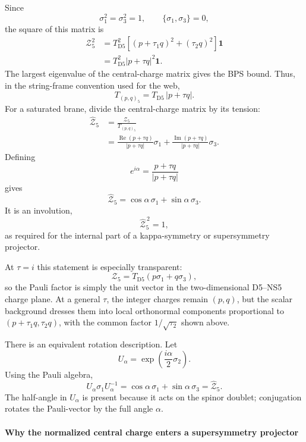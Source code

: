 \documentclass[
  10pt,
  a4paper,
  openany]{book}
\begin{document}
Since \[
\sigma_1^2=\sigma_3^2=1,
\qquad
\{\sigma_1,\sigma_3\}=0,
\] the square of this matrix is \[
\begin{aligned}
\mathcal Z_5^2
&=T_{\mathrm{D5}}^2
\left[
(p+\tau_1q)^2+(\tau_2q)^2
\right]\mathbf1\\
&=T_{\mathrm{D5}}^2|p+\tau q|^2\mathbf1.
\end{aligned}
\] The largest eigenvalue of the central-charge matrix gives the BPS
bound. Thus, in the string-frame convention used for the web, \[
T_{(p,q)_5}
=T_{\mathrm{D5}}\,|p+\tau q|.
\] For a saturated brane, divide the central-charge matrix by its
tension: \[
\begin{aligned}
\widehat{\mathcal Z}_5
&=\frac{\mathcal Z_5}{T_{(p,q)_5}}\\
&=\frac{\operatorname{Re}(p+\tau q)}{|p+\tau q|}\sigma_1
+\frac{\operatorname{Im}(p+\tau q)}{|p+\tau q|}\sigma_3.
\end{aligned}
\] Defining \[
e^{i\alpha}
=\frac{p+\tau q}{|p+\tau q|}
\] gives \[
\boxed{
\widehat{\mathcal Z}_5
=\cos\alpha\,\sigma_1+\sin\alpha\,\sigma_3
}.
\] It is an involution, \[
\widehat{\mathcal Z}_5^{\,2}=1,
\] as required for the internal part of a kappa-symmetry or
supersymmetry projector.

At \(\tau=i\) this statement is especially transparent: \[
\mathcal Z_5
=T_{\mathrm{D5}}(p\sigma_1+q\sigma_3),
\] so the Pauli factor is simply the unit vector in the two-dimensional
D5--NS5 charge plane. At a general \(\tau\), the integer charges remain
\((p,q)\), but the scalar background dresses them into local orthonormal
components proportional to \((p+\tau_1q,\tau_2q)\), with the common
factor \(1/\sqrt{\tau_2}\) shown above.

There is an equivalent rotation description. Let \[
U_\alpha
=\exp\left(\frac{i\alpha}{2}\sigma_2\right).
\] Using the Pauli algebra, \[
U_\alpha\sigma_1U_\alpha^{-1}
=\cos\alpha\,\sigma_1+\sin\alpha\,\sigma_3
=\widehat{\mathcal Z}_5.
\] The half-angle in \(U_\alpha\) is present because it acts on the
spinor doublet; conjugation rotates the Pauli-vector by the full angle
\(\alpha\).

\paragraph{Why the normalized central charge enters a supersymmetry
projector}\label{why-the-normalized-central-charge-enters-a-supersymmetry-projector}
\end{document}
